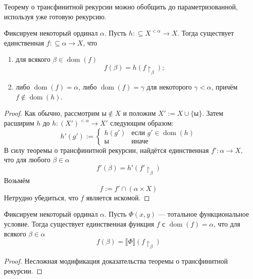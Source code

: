 \documentclass[12pt,a4paper]{article}
\DeclareMathOperator{\dom}{dom}
\begin{document}
    \begin{remark*}
        Теорему о трансфинитной рекурсии можно обобщить до параметризованной, используя уже готовую рекурсию.
    \end{remark*}

    \begin{theorem}
        Фиксируем некоторый ординал $\alpha$. Пусть $h: \subseteq X^{<\alpha} \to X$. Тогда существует единственная $f: \subseteq \alpha \to X$, что
        \begin{enumerate}
            \item для всякого $\beta \in \dom(f)$
                \[f(\beta) = h(f \upharpoonright_\beta);\]
            \item либо $\dom(f) = \alpha$, либо $\dom(f) = \gamma$ для некоторого $\gamma < \alpha$, причём $f \notin \dom(h)$.
        \end{enumerate}
    \end{theorem}

    \begin{proof}
        Как обычно, рассмотрим $\text{ы} \notin X$ и положим $X' := X \cup \{\text{ы}\}$. Затем расширим $h$ до $h: (X')^{<\alpha} \to X'$ следующим образом:
        \[h'(g') := \begin{cases}
            h(g')& \text{если $g' \in \dom(h)$}\\
            \text{ы}& \text{иначе}
        \end{cases}\]
        В силу теоремы о трансфинитной рекурсии, найдётся единственная $f': \alpha \to X$, что для любого $\beta \in \alpha$
        \[f'(\beta) = h'(f' \upharpoonright_\beta)\]
        Возьмём
        \[f := f' \cap (\alpha \times X)\]
        Нетрудно убедиться, что $f$ является искомой.
    \end{proof}

    \begin{theorem}
        Фиксируем некоторый ординал $\alpha$. Пусть $\Phi(x, y)$ --- тотальное функциональное условие. Тогда существует единственная функция $f$ с $\dom(f) = \alpha$, что для всякого $\beta \in \alpha$
        \[f(\beta) = \llbracket \Phi \rrbracket(f \upharpoonright_\beta)\]
    \end{theorem}

    \begin{proof}
        Несложная модификация доказательства теоремы о трансфинитной рекурсии.
    \end{proof}
\end{document}
